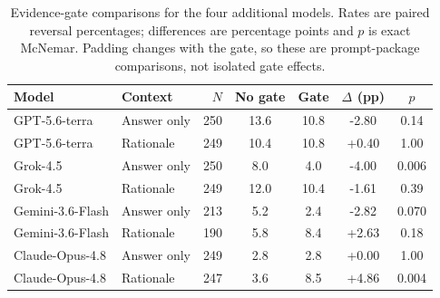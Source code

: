 \begin{table}[htbp]
\caption{Evidence-gate comparisons for the four additional models. Rates are paired reversal percentages; differences are percentage points and $p$ is exact McNemar. Padding changes with the gate, so these are prompt-package comparisons, not isolated gate effects.}
\label{tab:additional_gates}
\centering
\small
\setlength{\tabcolsep}{3.5pt}
\begin{tabular}{llrcccc}
\toprule
Model & Context & $N$ & No gate & Gate & $\Delta$ (pp) & $p$ \\
\midrule
GPT-5.6-terra & Answer only & 250 & 13.6 & 10.8 & -2.80 & 0.14 \\
GPT-5.6-terra & Rationale & 249 & 10.4 & 10.8 & +0.40 & 1.00 \\
Grok-4.5 & Answer only & 250 & 8.0 & 4.0 & -4.00 & 0.006 \\
Grok-4.5 & Rationale & 249 & 12.0 & 10.4 & -1.61 & 0.39 \\
Gemini-3.6-Flash & Answer only & 213 & 5.2 & 2.4 & -2.82 & 0.070 \\
Gemini-3.6-Flash & Rationale & 190 & 5.8 & 8.4 & +2.63 & 0.18 \\
Claude-Opus-4.8 & Answer only & 249 & 2.8 & 2.8 & +0.00 & 1.00 \\
Claude-Opus-4.8 & Rationale & 247 & 3.6 & 8.5 & +4.86 & 0.004 \\
\bottomrule
\end{tabular}
\end{table}
